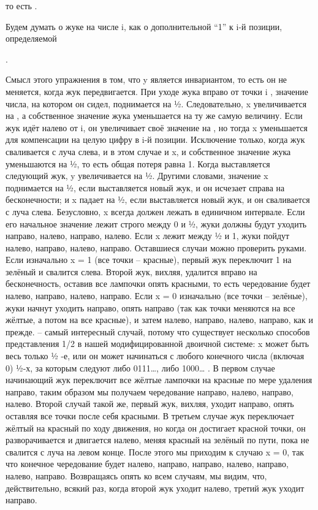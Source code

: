  то есть 
                 . 
                   


Будем думать о жуке на числе i, как о дополнительной “1”  к i-й позиции, определяемой 
 
                              .


Смысл этого упражнения в том, что y является инвариантом, то есть он не меняется, когда жук передвигается. При уходе жука вправо от точки i , значение числа, на котором он сидел,  поднимается на ½. Следовательно, x увеличивается на , а собственное значение жука уменьшается на ту же самую величину. Если жук идёт налево от i, он увеличивает своё значение на , но тогда  x  уменьшается для компенсации на целую цифру в i-й позиции.
   Исключение только, когда жук сваливается с луча слева, и в этом случае и x, и собственное значение жука  уменьшаются на ½, то есть  общая потеря равна 1. Когда выставляется следующий жук, y увеличивается на ½. Другими словами, значение x поднимается на ½, если выставляется новый жук, и он исчезает справа на бесконечности; и x падает на ½, если выставляется новый жук, и он сваливается с луча слева.
   Безусловно, x всегда должен лежать в единичном интервале. Если его начальное значение лежит строго между 0 и ½, жуки должны будут уходить направо, налево, направо, налево. Если x лежит между ½ и 1, жуки пойдут налево, направо, налево, направо.
   Оставшиеся случаи можно проверить руками. Если изначально x = 1 (все точки -- красные), первый жук переключит 1 на зелёный и свалится слева. Второй жук, вихляя, удалится вправо на бесконечность, оставив все лампочки опять красными, то есть чередование будет налево, направо, налево, направо. Если x = 0 изначально (все точки -- зелёные), жуки начнут уходить направо, опять направо (так как точки  меняются на все жёлтые, а потом на все красные), и затем налево, направо, налево, направо, как и прежде.
   -- самый интересный случай, потому что существует несколько способов представления 1/2 в нашей модифицированной двоичной системе: x может быть весь только ½ -е, или он может начинаться с любого конечного числа (включая 0) ½-х, за которым следуют либо 0111…, либо 1000… . В первом случае начинающий жук переключит все жёлтые лампочки на красные по мере удаления направо, таким образом мы получаем чередование  направо, налево, направо, налево. Второй случай такой же, первый жук, вихляя, уходит направо, опять оставляя все точки после себя красными. 
В третьем случае жук переключает жёлтый на красный по ходу движения, но когда он достигает красной точки, он разворачивается и двигается налево, меняя красный на зелёный по пути, пока не свалится с луча на левом конце. После этого мы приходим к случаю  x = 0, так что конечное чередование будет налево, направо, направо, налево, направо, налево, направо.
   Возвращаясь опять ко всем случаям, мы видим, что, действительно, всякий раз, когда второй жук уходит налево, третий жук уходит направо.


